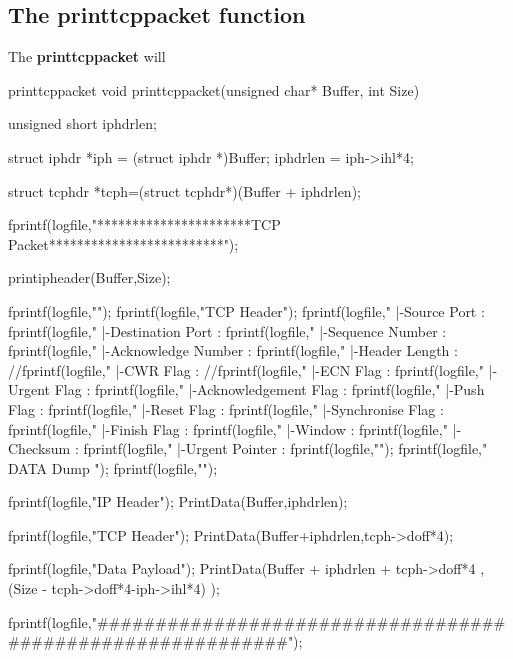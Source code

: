 \subsection{The printtcppacket function}
The {\bf printtcppacket} will 
\begin{chunk}{printtcppacket}
void printtcppacket(unsigned char* Buffer, int Size)
{
    unsigned short iphdrlen;
     
    struct iphdr *iph = (struct iphdr *)Buffer;
    iphdrlen = iph->ihl*4;
     
    struct tcphdr *tcph=(struct tcphdr*)(Buffer + iphdrlen);
             
    fprintf(logfile,"\n\n***********************TCP Packet*************************\n");   
         
    printipheader(Buffer,Size);
         
    fprintf(logfile,"\n");
    fprintf(logfile,"TCP Header\n");
    fprintf(logfile,"   |-Source Port      : %
    fprintf(logfile,"   |-Destination Port : %
    fprintf(logfile,"   |-Sequence Number    : %
    fprintf(logfile,"   |-Acknowledge Number : %
    fprintf(logfile,"   |-Header Length      : %
    //fprintf(logfile,"   |-CWR Flag : %
    //fprintf(logfile,"   |-ECN Flag : %
    fprintf(logfile,"   |-Urgent Flag          : %
    fprintf(logfile,"   |-Acknowledgement Flag : %
    fprintf(logfile,"   |-Push Flag            : %
    fprintf(logfile,"   |-Reset Flag           : %
    fprintf(logfile,"   |-Synchronise Flag     : %
    fprintf(logfile,"   |-Finish Flag          : %
    fprintf(logfile,"   |-Window         : %
    fprintf(logfile,"   |-Checksum       : %
    fprintf(logfile,"   |-Urgent Pointer : %
    fprintf(logfile,"\n");
    fprintf(logfile,"                        DATA Dump                         ");
    fprintf(logfile,"\n");
         
    fprintf(logfile,"IP Header\n");
    PrintData(Buffer,iphdrlen);
         
    fprintf(logfile,"TCP Header\n");
    PrintData(Buffer+iphdrlen,tcph->doff*4);
         
    fprintf(logfile,"Data Payload\n"); 
    PrintData(Buffer + iphdrlen + tcph->doff*4 , (Size - tcph->doff*4-iph->ihl*4) );
                         
    fprintf(logfile,"\n###########################################################");
}

\end{chunk}

